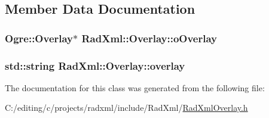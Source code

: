 \subsection{Member Data Documentation}
\hypertarget{class_rad_xml_1_1_overlay_a48e028c8ac83f4af1de7eef9b6f01233}{
\subsubsection[{o\-Overlay}]{\setlength{\rightskip}{0pt plus 5cm}Ogre\-::\-Overlay$\ast$ Rad\-Xml\-::\-Overlay\-::o\-Overlay\hspace{0.3cm}{\ttfamily [protected]}}}\label{class_rad_xml_1_1_overlay_a48e028c8ac83f4af1de7eef9b6f01233}
\hypertarget{class_rad_xml_1_1_overlay_ad46f4b57b85a4b8895a8801605184298}{
\subsubsection[{overlay}]{\setlength{\rightskip}{0pt plus 5cm}std\-::string Rad\-Xml\-::\-Overlay\-::overlay\hspace{0.3cm}{\ttfamily [protected]}}}\label{class_rad_xml_1_1_overlay_ad46f4b57b85a4b8895a8801605184298}


The documentation for this class was generated from the following file\-:\begin{DoxyCompactItemize}
\item 
C\-:/editing/c/projects/radxml/include/\-Rad\-Xml/\hyperlink{_rad_xml_overlay_8h}{Rad\-Xml\-Overlay.\-h}\end{DoxyCompactItemize}
